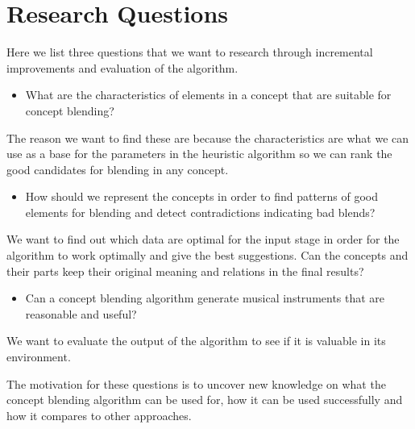 \section{Research Questions}
Here we list three questions that we want to research through incremental improvements and evaluation of the algorithm.
\begin{itemize}
\item What are the characteristics of elements in a concept that are suitable for concept blending?
\end{itemize}
The reason we want to find these are because the characteristics are what we can use as a base for the parameters in the heuristic algorithm so we can rank the good candidates for blending in any concept.
\begin{itemize}
\item How should we represent the concepts in order to find patterns of good elements for blending and detect contradictions indicating bad blends?
\end{itemize}
We want to find out which data are optimal for the input stage in order for the algorithm to work optimally and give the best suggestions. Can the concepts and their parts keep their original meaning and relations in the final results?
\begin{itemize}
\item Can a concept blending algorithm generate musical instruments that are reasonable and useful?
\end{itemize}
We want to evaluate the output of the algorithm to see if it is valuable in its environment.

The motivation for these questions is to uncover new knowledge on what the concept blending algorithm can be used for, how it can be used successfully and how it compares to other approaches.

